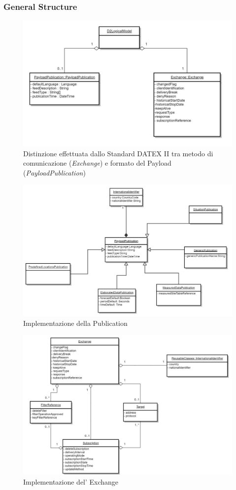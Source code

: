 \subsubsection{General Structure}
\begin{figure}
	\begin{center}
		\includegraphics[width=0.6\columnwidth]{images/uml_1}
	\end{center}
	\caption{Distinzione effettuata dallo Standard DATEX II tra metodo di comunicazione (\textit{Exchange}) e formato del Payload (\textit{PayloadPublication})}
	\label{fig:app_uml_1}
\end{figure}
\begin{figure}
	\begin{center}
		\includegraphics[width=0.9\columnwidth]{images/datexii_publication_implementation}
	\end{center}
	\caption{Implementazione della Publication}
	\label{fig:app_datexii_publication_implementation}
\end{figure}
\begin{figure}
	\begin{center}
		\includegraphics[width=0.8\columnwidth]{images/uml_2}
	\end{center}
	\caption{Implementazione del' Exchange}
	\label{fig:app_uml_2}
\end{figure}
